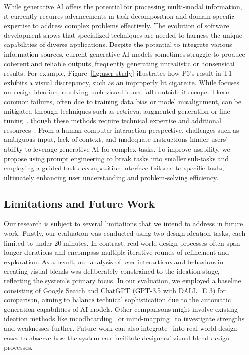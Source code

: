 While generative AI offers the potential for processing multi-modal information, it currently requires advancements in task decomposition and domain-specific expertise to address complex problems effectively.
The evolution of software development shows that specialized techniques are needed to harness the unique capabilities of diverse applications. 
Despite the potential to integrate various information sources, current generative AI models sometimes struggle to produce coherent and reliable outputs, frequently generating unrealistic or nonsensical results.
For example, Figure~\ref{fig:user-study} illustrates how P6's result in T1 exhibits a visual discrepancy, such as an improperly lit cigarette. 
While \sysname{} focuses on design ideation, resolving such visual issues falls outside its scope. 
These common failures, often due to training data bias or model misalignment, can be mitigated through techniques such as retrieval-augmented generation or fine-tuning~\cite {liu2024survey}, though these methods require technical expertise and additional resources~\cite{gao2024retrievalaugmentedgenerationlargelanguage}.
From a human-computer interaction perspective, challenges such as ambiguous input, lack of context, and inadequate instructions hinder users' ability to leverage generative AI for complex tasks. 
To improve usability, we propose using prompt engineering to break tasks into smaller sub-tasks and employing a guided task decomposition interface tailored to specific tasks, ultimately enhancing user understanding and problem-solving efficiency.


\subsection{Limitations and Future Work}





Our research is subject to several limitations that we intend to address in future work.
Firstly, our evaluation was conducted using two design ideation tasks, each limited to under 20 minutes. 
In contrast, real-world design processes often span longer durations and encompass multiple iterative rounds of refinement and exploration. 
As a result, our analysis of user interactions and behaviors in creating visual blends was deliberately constrained to the ideation stage, reflecting the system’s primary focus.
In our evaluation, we employed a baseline consisting of Google Search and ChatGPT (GPT-3.5 with DALL·E 3) for comparison, aiming to balance technical sophistication due to the automatic generation capabilities of AI models. 
Other comparisons might involve existing ideation methods like moodboarding~\cite{10.1145/3290605.3300863} or mind-mapping~\cite{10.1145/3411764.3445325} to investigate strengths and weaknesses further.
Future work can also integrate \sysname\ into real-world design cases to observe how the system can facilitate designers' visual blend design processes.


